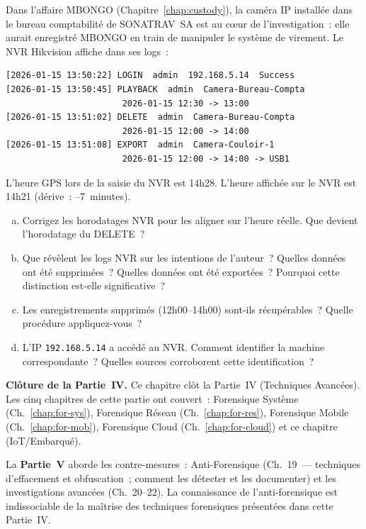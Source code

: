 \begin{boxexo}[title={\ding{45}\quad Exercice~18.3 --- Timeline IoT multi-sources \niveauexpert}]
Dans l'affaire MBONGO (Chapitre~\ref{chap:custody}), la caméra IP
installée dans le bureau comptabilité de SONATRAV~SA est au c\oe ur
de l'investigation~: elle aurait enregistré MBONGO en train de
manipuler le système de virement. Le NVR Hikvision affiche dans
ses logs~:
\begin{lstlisting}[language=bash_forensique]
[2026-01-15 13:50:22] LOGIN  admin  192.168.5.14  Success
[2026-01-15 13:50:45] PLAYBACK  admin  Camera-Bureau-Compta
                       2026-01-15 12:30 -> 13:00
[2026-01-15 13:51:02] DELETE  admin  Camera-Bureau-Compta
                       2026-01-15 12:00 -> 14:00
[2026-01-15 13:51:08] EXPORT  admin  Camera-Couloir-1
                       2026-01-15 12:00 -> 14:00 -> USB1
\end{lstlisting}
L'heure GPS lors de la saisie du NVR est 14h28. L'heure affichée
sur le NVR est 14h21 (dérive~: --7~minutes).
\begin{enumerate}[(a)]
    \item Corrigez les horodatages NVR pour les aligner sur l'heure
          réelle. Que devient l'horodatage du DELETE~?
    \item Que révèlent les logs NVR sur les intentions de l'auteur~?
          Quelles données ont été supprimées~? Quelles données
          ont été exportées~? Pourquoi cette distinction est-elle
          significative~?
    \item Les enregistrements supprimés (12h00--14h00) sont-ils
          récupérables~? Quelle procédure appliquez-vous~?
    \item L'IP \texttt{192.168.5.14} a accédé au NVR. Comment
          identifier la machine correspondante~? Quelles sources
          corroborent cette identification~?
\end{enumerate}
\end{boxexo}

\bigskip

\begin{boxinfo}
\textbf{Clôture de la Partie~IV.} Ce chapitre clôt la Partie~IV
(Techniques Avancées). Les cinq chapitres de cette partie ont
couvert~: Forensique Système (Ch.~\ref{chap:for-sys}), Forensique
Réseau (Ch.~\ref{chap:for-res}), Forensique Mobile
(Ch.~\ref{chap:for-mob}), Forensique Cloud (Ch.~\ref{chap:for-cloud})
et ce chapitre (IoT/Embarqué).

La \textbf{Partie~V} aborde les contre-mesures~: Anti-Forensique
(Ch.~19~--- techniques d'effacement et obfuscation~; comment les
détecter et les documenter) et les investigations avancées
(Ch.~20--22). La connaissance de l'anti-forensique est indissociable
de la maîtrise des techniques forensiques présentées dans
cette Partie~IV.
\end{boxinfo}
